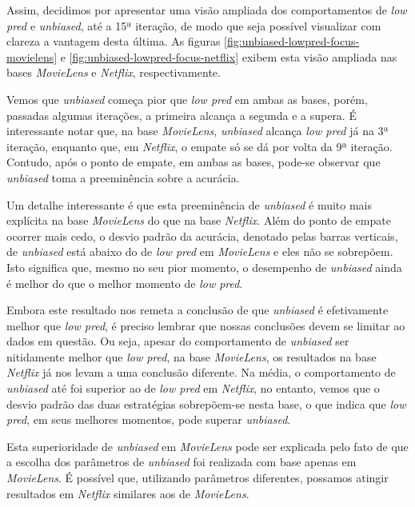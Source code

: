 Assim, decidimos por apresentar uma visão ampliada dos comportamentos de \textit{low pred} e \textit{unbiased}, até a 15ª iteração, de modo que seja possível visualizar com clareza a vantagem desta última. As figuras \ref{fig:unbiased-lowpred-focus-movielens} e \ref{fig:unbiased-lowpred-focus-netflix} exibem esta visão ampliada nas bases \textit{MovieLens} e \textit{Netflix}, respectivamente.

Vemos que \textit{unbiased} começa pior que \textit{low pred} em ambas as bases, porém, passadas algumas iterações, a primeira alcança a segunda e a supera. É interessante notar que, na base \textit{MovieLens}, \textit{unbiased} alcança \textit{low pred} já na 3ª iteração, enquanto que, em \textit{Netflix}, o empate só se dá por volta da 9ª iteração. Contudo, após o ponto de empate, em ambas as bases, pode-se observar que \textit{unbiased} toma a preeminência sobre a acurácia.

Um detalhe interessante é que esta preeminência de \textit{unbiased} é muito mais explícita na base \textit{MovieLens} do que na base \textit{Netflix}. Além do ponto de empate ocorrer mais cedo, o desvio padrão da acurácia, denotado pelas barras verticais, de \textit{unbiased} está abaixo do de \textit{low pred} em \textit{MovieLens} e eles não se sobrepõem. Isto significa que, mesmo no seu pior momento, o desempenho de \textit{unbiased} ainda é melhor do que o melhor momento de \textit{low pred}.

Embora este resultado nos remeta a conclusão de que \textit{unbiased} é efetivamente melhor que \textit{low pred}, é preciso lembrar que nossas conclusões devem se limitar ao dados em questão. Ou seja, apesar do comportamento de \textit{unbiased} ser nitidamente melhor que \textit{low pred}, na base \textit{MovieLens}, os resultados na base \textit{Netflix} já nos levam a uma conclusão diferente. Na média, o comportamento de \textit{unbiased} até foi superior ao de \textit{low pred} em \textit{Netflix}, no entanto, vemos que o desvio padrão das duas estratégias sobrepõem-se nesta base, o que indica que \textit{low pred}, em seus melhores momentos, pode superar \textit{unbiased}. 

Esta superioridade de \textit{unbiased} em \textit{MovieLens} pode ser explicada pelo fato de que a escolha dos parâmetros de \textit{unbiased} foi realizada com base apenas em \textit{MovieLens}. É possível que, utilizando parâmetros diferentes, possamos atingir resultados em \textit{Netflix} similares aos de \textit{MovieLens}. 

